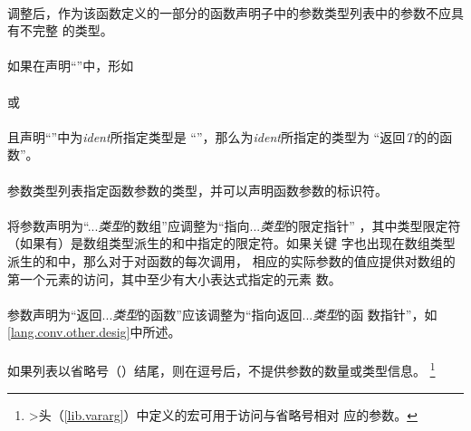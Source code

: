 {\paragraph{}
调整后，作为该函数定义的一部分的函数声明子中的参数类型列表中的参数不应具有不完整
的类型。

\semantic
\paragraph{}
如果在声明``''中，形如                                        \\
\mbox{\hspace{4em}  \tm{)}}                    \\
或                                                                            \\
\mbox{\hspace{4em}  \tm{)}}              \\
且声明``''中为\textit{ident}所指定类型是
``''，那么为\textit{ident}所指定的类型为
``返回\textit{T}的的函数''。

\paragraph{}
参数类型列表指定函数参数的类型，并可以声明函数参数的标识符。

\paragraph{}
将参数声明为``...\textit{类型}的数组''应调整为``指向...\textit{类型}的限定指针''
，其中类型限定符（如果有）是数组类型派生的\tm{[}和\tm{]}中指定的限定符。如果关键
字也出现在数组类型派生的\tm{[}和\tm{]}中，那么对于对函数的每次调用，
相应的实际参数的值应提供对数组的第一个元素的访问，其中至少有大小表达式指定的元素
数。

\paragraph{}
参数声明为``返回...\textit{类型}的函数''应该调整为``指向返回...\textit{类型}的函
数指针''，如\ref{lang.conv.other.desig}中所述。

\paragraph{}
如果列表以省略号（）结尾，则在逗号后，不提供参数的数量或类型信息。
\footnote{>头（\ref{lib.vararg}）中定义的宏可用于访问与省略号相对
应的参数。}

}
